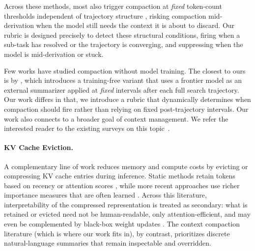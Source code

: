 \documentclass{article}
\begin{document}
Across these methods, most also trigger compaction at \textit{fixed} token-count thresholds independent of trajectory structure \citep{yan2026inftythink, aghajohari2025markovian, wu2026reasoningcachecontinualimprovement, wu2026resumunlockinglonghorizonsearch}, risking compaction mid-derivation when the model still needs the context it is about to discard. Our rubric is designed precisely to detect these structural conditions, firing when a sub-task has resolved or the trajectory is converging, and suppressing when the model is mid-derivation or stuck.


Few works have studied compaction without model training. The closest to ours is by  \citet{zhu2026retracrecursivetrajectorycompression}, which introduces a training-free  variant that uses a frontier model as an external summarizer applied at \textit{fixed} intervals after each full search trajectory. Our work differs in that, we introduce a rubric that dynamically determines when compaction should fire rather than relying on fixed post-trajectory intervals. Our work also connects to a broader goal of context management. We refer the interested reader to the existing surveys on this topic~\citep{mei2025survey}. 

\paragraph{KV Cache Eviction.}
A complementary line of work reduces memory and compute costs by evicting or compressing KV cache entries during inference. 
Static methods retain tokens based on recency \citep{xiao2023efficient} or attention scores \citep{li2024snapkv}, while more recent approaches use richer importance measures that are often learned \citep{park2025keydiff,eyuboglu2025cartridges, zweiger2026fast,monea2025breadcrumbs,li2026neuralgarbagecollectionlearning}. Across this literature, interpretability of the compressed representation is treated as secondary: what is retained or evicted need not be human-readable, only attention-efficient, and may even be complemented by black-box weight updates \citep{zuo2026rethinkingloramemorylens}. The context compaction literature (which is where our work fits in), by contrast, prioritizes discrete natural-language summaries that remain inspectable and overridden.
\end{document}

